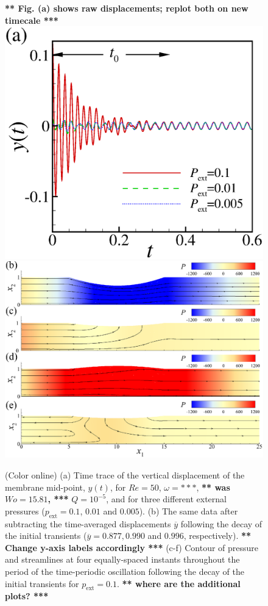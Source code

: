 \documentclass[aps,prl,reprint,superscriptaddress,floatfix]{revtex4-1}
\newcommand{\Rey}{\mathit{Re}}
\newcommand{\Wo}{\mathit{Wo}}
\begin{document}
\begin{figure}
  \centering
  {\bf *** Fig. (a) shows raw displacements; replot both on new timecale ***} \\
\includegraphics[width=0.49\linewidth, trim={0.5cm 0.5cm 1.5cm 0.5cm}, clip]{./epsFig/fig2a.eps}
  \includegraphics[width=1\linewidth]{./epsFig/fig1b.eps}
\caption{\label{fig:extpressure}(Color online)  (a) Time trace of the vertical
  displacement of the membrane mid-point, $y(t)$, for $\Rey=50$, $\omega=***$,
  {\bf *** was $\Wo=15.81$, ***}
  $Q=10^{-5}$,
  and for three different external pressures ($p_\text{ext}=0.1$, $0.01$
  and $0.005$). (b) The same data after subtracting the
  time-averaged displacements $\overline{y}$ following the decay of the
  initial transients ($\overline{y} = 0.877, 0.990$ and $0.996$,
  respectively). {\bf *** Change y-axis labels accordingly ***}
  (c-f) Contour of pressure
  and streamlines at four equally-spaced
  instants throughout the period of the time-periodic oscillation
  following the decay of the initial transients for $p_\text{ext}=0.1$.
  {\bf *** where are the additional
    plots? *** }}
\end{figure}
\end{document}
